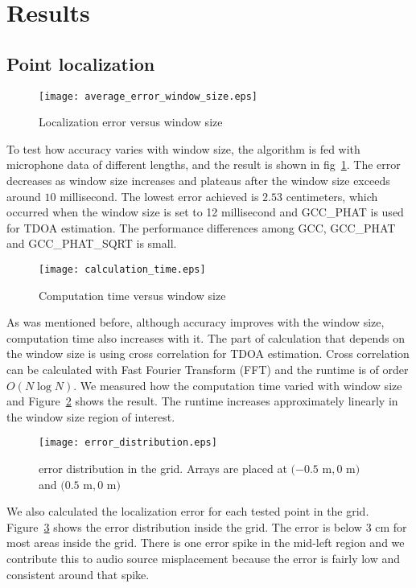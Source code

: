 \section{Results}
\subsection{Point localization}
\begin{figure}[h!]
\centering
\texttt{[image: average\_error\_window\_size.eps]}
\caption{Localization error versus window size}
\label{fig:accuracy_vs_window}
\end{figure}
To test how accuracy varies with window size, the algorithm is fed with microphone data of different lengths, and the result is shown in fig~\ref{fig:accuracy_vs_window}. The error decreases as window size increases and plateaus after the window size exceeds around $10$ millisecond. The lowest error achieved is $2.53$ centimeters, which occurred when the window size is set to 12 millisecond and GCC\_PHAT is used for TDOA estimation. The performance differences among GCC, GCC\_PHAT and GCC\_PHAT\_SQRT is small.

\begin{figure}[h!]
\centering
\texttt{[image: calculation\_time.eps]}
\caption{Computation time versus window size}
\label{fig:speed_vs_window}
\end{figure}
As was mentioned before, although accuracy improves with the window size, computation time also increases with it. The part of calculation that depends on the window size is using cross correlation for TDOA estimation. Cross correlation can be calculated with Fast Fourier Transform (FFT) and the runtime is of order $O(N\log N)$. We measured how the computation time varied with window size and Figure~\ref{fig:speed_vs_window} shows the result. The runtime increases approximately linearly in the window size region of interest.

\begin{figure}[h!]
\centering
\texttt{[image: error\_distribution.eps]}
\caption{error distribution in the grid. Arrays are placed at $(-0.5$ m$, 0$ m$)$ and $(0.5$ m$, 0$ m$)$}
\label{fig:error_distribution}
\end{figure}
We also calculated the localization error for each tested point in the grid. Figure~\ref{fig:error_distribution} shows the error distribution inside the grid. The error is below $3$ cm for most areas inside the grid. There is one error spike in the mid-left region and we contribute this to audio source misplacement because the error is fairly low and consistent around that spike.


